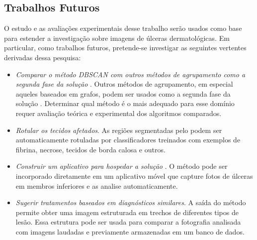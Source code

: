 \subsection{Trabalhos Futuros}

O estudo e as avaliações experimentais desse trabalho serão usados como base para estender a investigação sobre imagens de úlceras dermatológicas.
Em particular, como trabalhos futuros, pretende-se investigar as seguintes vertentes derivadas dessa pesquisa:

\begin{itemize}
    
    \item \textit{Comparar o método DBSCAN com outros métodos de agrupamento como a segunda fase da solução \system}. 
    Outros métodos de agrupamento, em especial aqueles baseados em grafos, podem ser usados como a segunda fase da solução \system. 
    Determinar qual método é o mais adequado para esse domínio requer avaliação teórica e experimental dos algoritmos comparados.
    
    \item \textit{Rotular os tecidos afetados}.
    As regiões segmentadas pelo \system podem ser automaticamente rotuladas por classificadores treinados com exemplos de fibrina, necrose, tecidos de borda calosa e outros. 
     
    \item \textit{Construir um aplicativo para hospedar a solução \system}.
    O método \system pode ser incorporado diretamente em um aplicativo móvel que capture fotos de úlceras em membros inferiores e as analise automaticamente.
    
    \item \textit{Sugerir tratamentos baseados em diagnósticos similares}.
    A saída do método \system permite obter uma imagem estruturada em trechos de diferentes tipos de lesão.
    Essa estrutura pode ser usada para comparar a fotografia analisada com imagens laudadas e previamente armazenadas em um banco de dados.    
\end{itemize}
